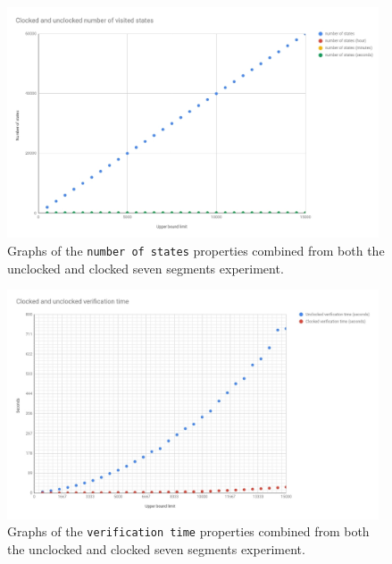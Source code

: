 \begin{figure}
    \includegraphics[width=0.98\textwidth]{./figures/temporary_graphs/combined_number_of_states.jpg}
\caption{Graphs of the \texttt{number of states} properties combined from both the unclocked and clocked seven segments experiment.}
\label{fig:combined_states}
\end{figure}

\begin{figure}
    \includegraphics[width=0.98\textwidth]{./figures/temporary_graphs/combined_verification_time.jpg}
\caption{Graphs of the \texttt{verification time} properties combined from both the unclocked and clocked seven segments experiment.}
\label{fig:combined_verification}
\end{figure}

